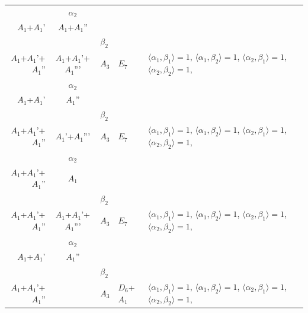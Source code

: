 \documentclass[12pt]{report}
\begin{document}
\begin{appendix}
{\begin{longtable}{rcl p{1cm}p{1cm}p{3cm} }
\begin{tabular}{cc}$\alpha_1$+ & $\alpha_2$\\\tiny{ $A_1$+$A_1$' } & \tiny{ $A_1$+$A_1$'' }\end{tabular} &\begin{tabular}{c} = \\~ \end{tabular} & \begin{tabular}{cc}$\beta_1$+ & $\beta_2$\\\tiny{ $A_1$+$A_1$'+$A_1$'' } & \tiny{ $A_1$+$A_1$'+$A_1$''' }\end{tabular} & $A_3$ & $E_7$ &  $\langle\alpha_1, \beta_1\rangle=1$, $\langle\alpha_1, \beta_2\rangle=1$, $\langle\alpha_2, \beta_1\rangle=1$, $\langle\alpha_2, \beta_2\rangle=1$, 
\\
\begin{tabular}{cc}$\alpha_1$+ & $\alpha_2$\\\tiny{ $A_1$+$A_1$' } & \tiny{ $A_1$'' }\end{tabular} &\begin{tabular}{c} = \\~ \end{tabular} & \begin{tabular}{cc}$\beta_1$+ & $\beta_2$\\\tiny{ $A_1$+$A_1$'+$A_1$'' } & \tiny{ $A_1$'+$A_1$''' }\end{tabular} & $A_3$ & $E_7$ &  $\langle\alpha_1, \beta_1\rangle=1$, $\langle\alpha_1, \beta_2\rangle=1$, $\langle\alpha_2, \beta_1\rangle=1$, $\langle\alpha_2, \beta_2\rangle=1$, 
\\
\begin{tabular}{cc}$\alpha_1$+ & $\alpha_2$\\\tiny{ $A_1$+$A_1$'+$A_1$'' } & \tiny{ $A_1$ }\end{tabular} &\begin{tabular}{c} = \\~ \end{tabular} & \begin{tabular}{cc}$\beta_1$+ & $\beta_2$\\\tiny{ $A_1$+$A_1$'+$A_1$'' } & \tiny{ $A_1$+$A_1$'+$A_1$''' }\end{tabular} & $A_3$ & $E_7$ &  $\langle\alpha_1, \beta_1\rangle=1$, $\langle\alpha_1, \beta_2\rangle=1$, $\langle\alpha_2, \beta_1\rangle=1$, $\langle\alpha_2, \beta_2\rangle=1$, 
\\
\begin{tabular}{cc}$\alpha_1$+ & $\alpha_2$\\\tiny{ $A_1$+$A_1$' } & \tiny{ $A_1$'' }\end{tabular} &\begin{tabular}{c} = \\~ \end{tabular} & \begin{tabular}{cc}$\beta_1$+ & $\beta_2$\\\tiny{ $A_1$+$A_1$'+$A_1$'' } & \tiny{  }\end{tabular} & $A_3$ & $D_6$+$A_1$ &  $\langle\alpha_1, \beta_1\rangle=1$, $\langle\alpha_1, \beta_2\rangle=1$, $\langle\alpha_2, \beta_1\rangle=1$, $\langle\alpha_2, \beta_2\rangle=1$, 

\end{longtable}}
\end{appendix}
\end{document}
